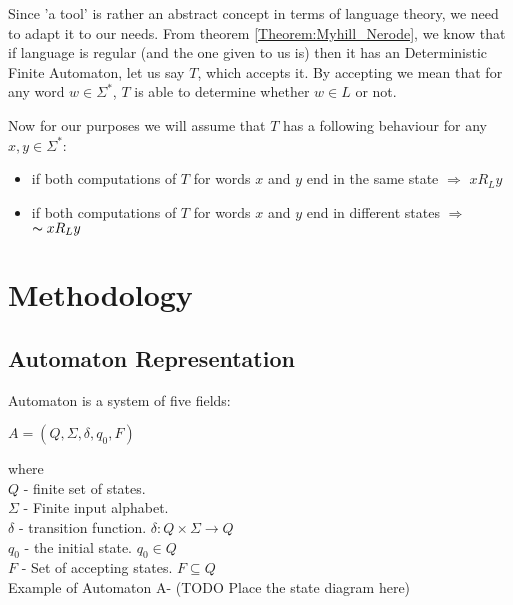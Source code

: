 \documentclass[runningheads,a4paper]{llncs}
\begin{document}
Since 'a tool' is rather an abstract concept in terms of language theory, we need to adapt it to our needs. From theorem \ref{Theorem:Myhill_Nerode}, we know that if language is regular (and the one given to us is) then it has an Deterministic Finite Automaton, let us say $T$, which accepts it. By accepting we mean that for any word $w \in \Sigma^{*}$, $T$ is able to determine whether $w \in L$ or not. 

Now for our purposes we will assume that $T$ has a following behaviour for any $x,y \in \Sigma^{*}$:
\begin{itemize}
  \item if both computations of $T$ for words $x$ and $y$ end in the same state $\Rightarrow$ $x R_{L} y$
  \item if both computations of $T$ for words $x$ and $y$ end in different states $\Rightarrow$ $\thicksim x R_{L} y$
\end{itemize}



\section{Methodology} \label{section:methodology}

\subsection{Automaton Representation} \label{sec:autom}

Automaton is a system of five fields:
\begin{center}
	$A = (Q, \Sigma, \delta, q_0, F)$
\end{center}

where \\
$Q$ - finite set of states. \\
$\Sigma$ - Finite input alphabet. \\
$\delta$ - transition function. $\delta: Q \times \Sigma \rightarrow Q$ \\
$q_0$ - the initial state. $q_0 \in Q$ \\
$F$ - Set of accepting states. $F \subseteq Q$ \\

Example of Automaton A- {\color{red}(TODO Place the state diagram here)}
\end{document}
